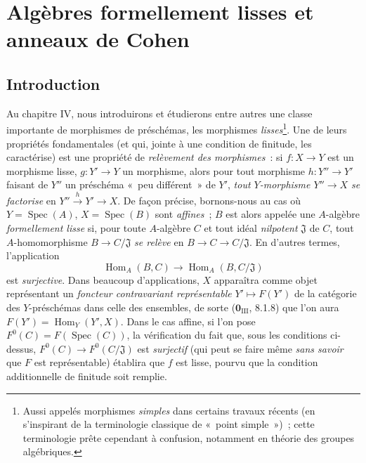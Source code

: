 \section{Algèbres formellement lisses et anneaux de Cohen}
\label{section:0.19-fr}
\label{0.19-fr}

\setcounter{subsection}{-1}
\subsection{Introduction}
\label{subsection:0.19.0-fr}
\label{0.19.0-fr}


\begin{env}[19.0.1]
\label{0.19.0.1-fr}
Au chapitre IV, nous introduirons et étudierons entre autres une classe
importante de morphismes de préschémas, les morphismes \emph{lisses}\footnote{Aussi
appelés morphismes \emph{simples} dans certains travaux récents (en s'inspirant
de la terminologie classique de «~point simple~»)~; cette terminologie prête
cependant à confusion, notamment en théorie des groupes algébriques.}. Une de
leurs propriétés fondamentales (et qui, jointe à une condition de finitude, les
caractérise) est une propriété de \emph{relèvement des morphismes}~: si
$f:X\to Y$ est un morphisme lisse, $g:Y'\to Y$ un morphisme, alors pour tout
morphisme $h:Y''\to Y'$ faisant de $Y''$ un préschéma «~peu différent~» de
$Y'$, \emph{tout $Y$-morphisme $Y''\to X$ se factorise} en
$Y''\xrightarrow{h}Y'\to X$. De façon précise, bornons-nous au cas où
$Y=\operatorname{Spec}(A)$, $X=\operatorname{Spec}(B)$ sont \emph{affines}~;
$B$ est alors appelée une $A$-algèbre \emph{formellement lisse} si, pour toute
$A$-algèbre $C$ et tout idéal \emph{nilpotent} $\mathfrak J$ de $C$, tout
$A$-homomorphisme $B\to C/\mathfrak J$ \emph{se relève} en
$B\to C\to C/\mathfrak J$. En d'autres termes, l'application
\[
  \operatorname{Hom}_A(B,C)\longrightarrow
  \operatorname{Hom}_A(B,C/\mathfrak J)
\]
est \emph{surjective}. Dans beaucoup d'applications, $X$ apparaîtra comme objet
représentant un \emph{foncteur contravariant représentable} $Y'\mapsto F(Y')$
de la catégorie des $Y$-préschémas dans celle des ensembles, de sorte
($\mathbf{0}_{\mathrm{III}}$, 8.1.8) que l'on aura
$F(Y')=\operatorname{Hom}_Y(Y',X)$. Dans le cas affine, si l'on pose
$F^0(C)=F(\operatorname{Spec}(C))$, la vérification du fait que, sous les
conditions ci-dessus, $F^0(C)\to F^0(C/\mathfrak J)$ est \emph{surjectif}
(qui peut se faire même \emph{sans savoir} que $F$ est représentable) établira
que $f$ est lisse, pourvu que la condition additionnelle de finitude soit
remplie.
\end{env}

